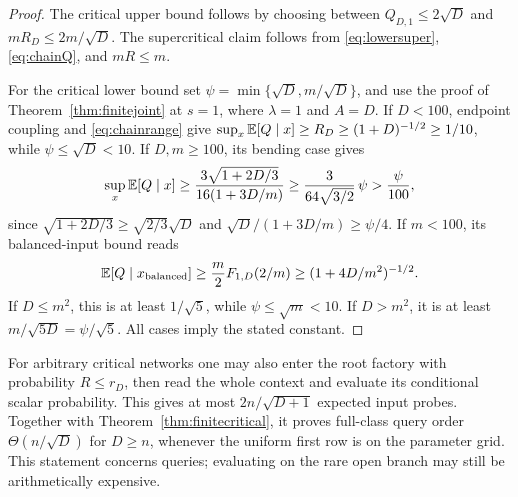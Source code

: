 \begin{proof}
The critical upper bound follows by choosing between
\(Q_{D,1}\le2\sqrt D\) and \(mR_D\le2m/\sqrt D\).
The supercritical claim follows from
\eqref{eq:lowersuper}, \eqref{eq:chainQ}, and \(mR\le m\).

For the critical lower bound set
\(\psi=\min\{\sqrt D,m/\sqrt D\}\), and use the proof of
Theorem~\ref{thm:finitejoint} at \(s=1\), where \(\lambda=1\) and
\(A=D\). If \(D<100\), endpoint coupling and
\eqref{eq:chainrange} give
\(\sup_x\mathbb E[Q\mid x]\ge R_D\ge(1+D)^{-1/2}\ge1/10\),
while \(\psi\le\sqrt D<10\). If \(D,m\ge100\), its bending case gives
\[
\sup_x\mathbb E[Q\mid x]\ge\frac{3\sqrt{1+2D/3}}{16(1+3D/m)}
\ge\frac{3}{64\sqrt{3/2}}\,\psi>\frac{\psi}{100},
\]
since \(\sqrt{1+2D/3}\ge\sqrt{2/3}\sqrt D\) and
\(\sqrt D/(1+3D/m)\ge\psi/4\).
If \(m<100\), its balanced-input bound reads
\begin{equation}\label{eq:balancedinfluence}
\mathbb E[Q\mid x_{\rm balanced}]
\ge\frac m2F_{1,D}(2/m)
\ge(1+4D/m^2)^{-1/2}.
\end{equation}
If \(D\le m^2\), this is at least \(1/\sqrt5\), while
\(\psi\le\sqrt m<10\).
If \(D>m^2\), it is at least
\(m/\sqrt{5D}=\psi/\sqrt5\).
All cases imply the stated constant.
\end{proof}

For arbitrary critical networks one may also enter the root factory
with probability \(R\le r_D\), then read the whole context and
evaluate its conditional scalar probability. This gives at most
\(2n/\sqrt{D+1}\) expected input probes.
Together with Theorem~\ref{thm:finitecritical}, it proves full-class
query order \(\Theta(n/\sqrt D)\) for \(D\ge n\), whenever the
uniform first row is on the parameter grid.
This statement concerns queries; evaluating on the rare open branch
may still be arithmetically expensive.
